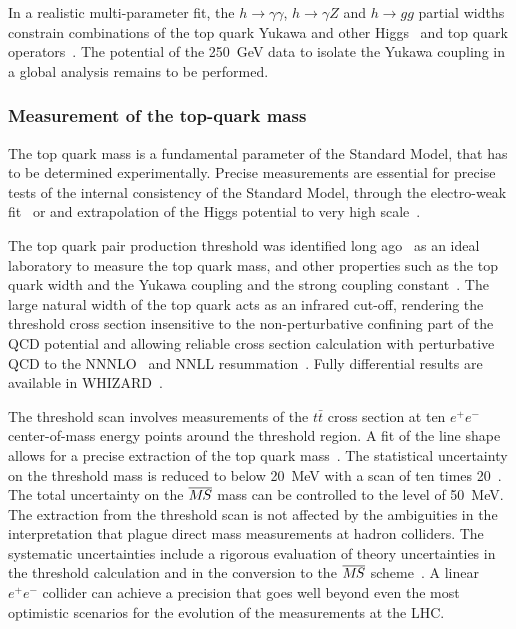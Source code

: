 In a realistic multi-parameter fit, the $h \rightarrow \gamma \gamma$, $h \rightarrow \gamma Z$ and $h \rightarrow gg$
partial widths constrain combinations of the top quark Yukawa and other Higgs~\cite{Azatov:2016xik} and top quark
operators~\cite{Vryonidou:2018eyv}. The potential of the 250~GeV data to isolate the Yukawa
coupling in a global analysis remains to be performed.


\subsubsection{Measurement of the top-quark mass}
\label{subsubsec:highE:topmass}

The top quark mass is a fundamental parameter of the Standard Model, that has to be
determined experimentally. Precise measurements are essential for precise tests of
the internal consistency of the Standard Model, through the electro-weak
fit~\cite{Baak:2014ora} or and extrapolation of the Higgs potential to very high
scale~\cite{Degrassi:2012ry}.

The top quark pair production threshold was identified long ago~\cite{Gusken:1985nf} as
an ideal laboratory to measure the top quark mass, and other properties such as the top quark
width and the Yukawa coupling and the strong coupling constant~\cite{Strassler:1990nw}.
The large natural width of the top quark acts as an infrared cut-off,
rendering the threshold cross section insensitive to the non-perturbative confining part
of the QCD potential and allowing reliable cross section calculation with perturbative QCD
to the NNNLO~\cite{Beneke:2015kwa} and NNLL resummation~\cite{Hoang:2013uda}. Fully
differential results are available in WHIZARD~\cite{Bach:2017ggt}.

The threshold scan involves measurements of the $t\bar{t}$ cross section at ten $e^+e^-$
center-of-mass energy points around the threshold region. A fit of the line shape allows for
a precise extraction of the top quark mass~\cite{Martinez:2002st,Horiguchi:2013wra,Seidel:2013sqa}.
The statistical uncertainty on the threshold mass is reduced to below 20~MeV with a scan of
ten times 20~\ifb. The total uncertainty on the $\msb$ mass can be controlled to the level
of 50~MeV. The extraction from the threshold scan is not affected by the ambiguities in the
interpretation that plague direct mass measurements at hadron colliders. The systematic uncertainties
include a rigorous evaluation of theory uncertainties in the threshold calculation and in the conversion
to the $\msb$ scheme~\cite{Simon:2016pwp}. A linear $e^+e^-$ collider can achieve a precision that goes well beyond
even the most optimistic scenarios for the evolution of the measurements at the LHC.


